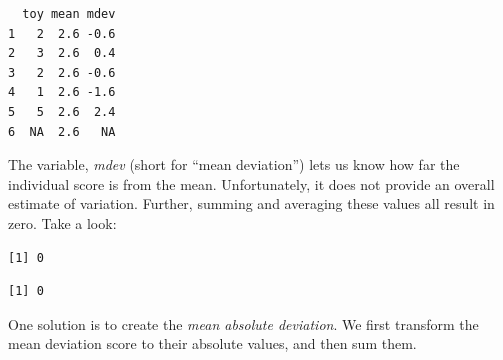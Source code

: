 \documentclass[
  11pt,
]{book}
\newenvironment{Shaded}{\begin{snugshade}}{\end{snugshade}}
\newcommand{\AttributeTok}[1]{\textcolor[rgb]{0.27,0.27,0.27}{#1}}
\newcommand{\CommentTok}[1]{\textcolor[rgb]{0.37,0.37,0.37}{\textit{#1}}}
\newcommand{\ConstantTok}[1]{\textcolor[rgb]{0.37,0.37,0.37}{#1}}
\newcommand{\DecValTok}[1]{\textcolor[rgb]{0.06,0.06,0.06}{#1}}
\newcommand{\FunctionTok}[1]{\textcolor[rgb]{0.27,0.27,0.27}{\textbf{#1}}}
\newcommand{\NormalTok}[1]{#1}
\newcommand{\OtherTok}[1]{\textcolor[rgb]{0.37,0.37,0.37}{#1}}
\newcommand{\SpecialCharTok}[1]{\textcolor[rgb]{0.43,0.43,0.43}{\textbf{#1}}}
\begin{document}
\begin{verbatim}
  toy mean mdev
1   2  2.6 -0.6
2   3  2.6  0.4
3   2  2.6 -0.6
4   1  2.6 -1.6
5   5  2.6  2.4
6  NA  2.6   NA
\end{verbatim}

The variable, \emph{mdev} (short for ``mean deviation'') lets us know how far the individual score is from the mean. Unfortunately, it does not provide an overall estimate of variation. Further, summing and averaging these values all result in zero. Take a look:

\begin{Shaded}
\end{Shaded}

\begin{verbatim}
[1] 0
\end{verbatim}

\begin{Shaded}
\end{Shaded}

\begin{verbatim}
[1] 0
\end{verbatim}

One solution is to create the \emph{mean absolute deviation}. We first transform the mean deviation score to their absolute values, and then sum them.

\begin{Shaded}
\end{Shaded}
\end{document}
